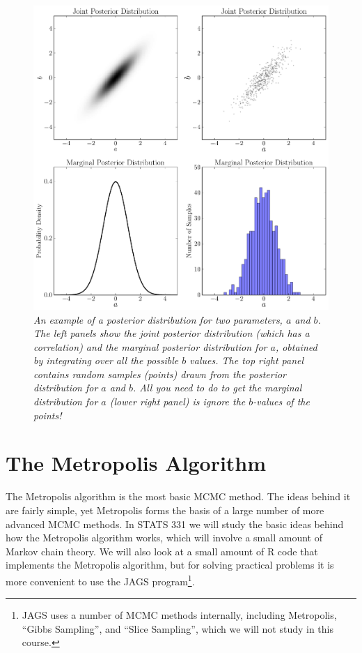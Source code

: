 \begin{figure}[ht!]
\begin{center}
\includegraphics[scale=0.5]{Figures/marginalisation.pdf}
\caption{\it An example of a posterior distribution for two parameters, $a$ and
$b$. The left panels show the joint posterior distribution (which has a
correlation) and the marginal posterior distribution for $a$, obtained by
integrating over all the possible $b$ values. The top right panel contains
random samples
(points) drawn from the posterior distribution for $a$ and $b$.
All you need to do to get the
marginal distribution for $a$ (lower right panel) is ignore the $b$-values of
the points!
\label{fig:marginalisation}}
\end{center}
\end{figure}


\section{The Metropolis Algorithm}
The Metropolis algorithm is the most basic MCMC method.
The ideas behind it are fairly simple, yet Metropolis forms the basis of a large
number of more advanced MCMC methods. In STATS 331 we will study the basic ideas
behind how the Metropolis algorithm works, which will involve a small amount
of Markov chain theory. We will also look at a small amount of R code
that implements the Metropolis algorithm, but for solving practical problems
it is more convenient to use the JAGS program\footnote{JAGS uses a number
of MCMC methods internally, including Metropolis, ``Gibbs Sampling'', and
``Slice Sampling'', which we will not study in this course.}.


